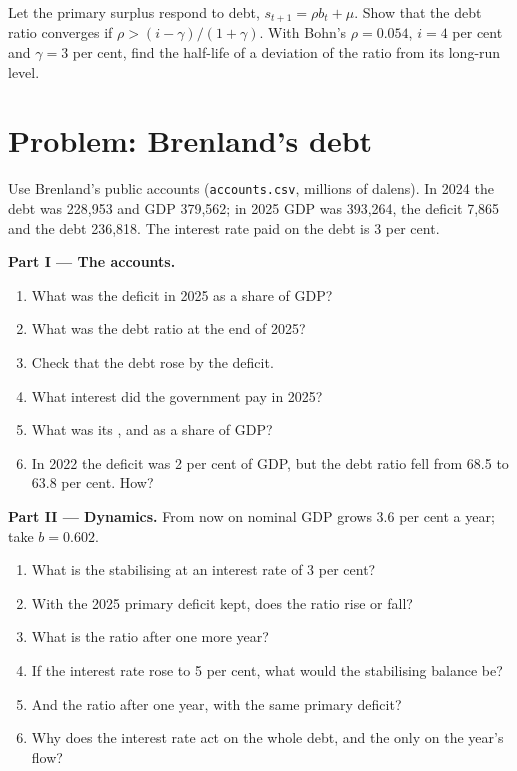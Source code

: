 \begin{exercise}[$\star\star\star$]\label{exo:b2:government-debt:12}
Let the primary surplus respond to debt, $s_{t+1} = \rho b_t + \mu$. Show that the debt ratio converges if $\rho > (i - \gamma)/(1 + \gamma)$. With Bohn's $\rho = 0.054$, $i = 4$ per cent and $\gamma = 3$ per cent, find the
half-life of a deviation of the ratio from its long-run level.
\end{exercise}

\section{Problem: Brenland's debt}\label{sec:b2:government-debt:problem}

\begin{problem}
\label{pb:b2:government-debt:1}
Use Brenland's public accounts (\texttt{accounts.csv}, millions of dalens). In 2024 the debt was 228,953 and GDP 379,562; in 2025 GDP was 393,264, the deficit 7,865
and the debt 236,818. The interest rate paid on the debt is 3 per cent.

\medskip
\noindent\textbf{Part I --- The accounts.}
\begin{enumerate}
  \item What was the deficit in 2025 as a share of GDP?
  \item What was the debt ratio at the end of 2025?
  \item Check that the debt rose by the deficit.
  \item What interest did the government pay in 2025?
  \item What was its , and as a share of GDP?
  \item In 2022 the deficit was 2 per cent of GDP, but the debt ratio fell from 68.5 to 63.8 per cent. How?
\end{enumerate}

\medskip
\noindent\textbf{Part II --- Dynamics.} From now on nominal GDP grows 3.6 per cent a year; take $b = 0.602$.
\begin{enumerate}[resume]
  \item What is the stabilising  at an interest rate of 3 per cent?
  \item With the 2025 primary deficit kept, does the ratio rise or fall?
  \item What is the ratio after one more year?
  \item If the interest rate rose to 5 per cent, what would the stabilising balance be?
  \item And the ratio after one year, with the same primary deficit?
  \item Why does the interest rate act on the whole debt, and the  only on the year's flow?
\end{enumerate}


\end{problem}

